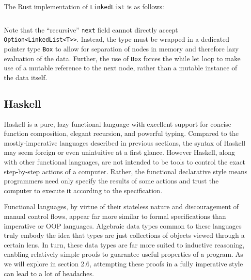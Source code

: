 \documentclass{article}
\begin{document}
The Rust implementation of \texttt{LinkedList} is as follows:
\inputminted{rust}{linked_list/main.rs}
Note that the ``recursive'' \texttt{next} field cannot directly accept \texttt{Option<LinkedList<T>>}.
Instead, the type must be wrapped in a dedicated pointer type \texttt{Box} to allow for separation of nodes in memory
and therefore lazy evaluation of the data. Further, the use of \texttt{Box} forces the while let loop to
make use of a mutable reference to the next node, rather than a mutable instance of the data itself.


\subsection{Haskell}

Haskell is a pure, lazy functional language with excellent support for concise function composition, elegant recursion, and powerful typing.
Compared to the mostly-imperative languages described in previous sections, the syntax of Haskell may seem foreign
or even unintuitive at a first glance. However Haskell, along with other functional languages, are not intended
to be tools to control the exact step-by-step actions of a computer. Rather, the functional declarative style means programmers need only
specify the results of some actions and trust the computer to execute it according to the specification.

Functional languages, by virtue of their stateless nature and discouragement of manual control flows, appear
far more similar to formal specifications than imperative or OOP languages. Algebraic data types common to these
languages truly embody the idea that types are just collections of objects viewed through a certain lens.
In turn, these data types are far more suited to inductive reasoning, enabling relatively simple proofs to
guarantee useful properties of a program. As we will explore in section 2.6, attempting these proofs
in a fully imperative style can lead to a lot of headaches.
\end{document}
